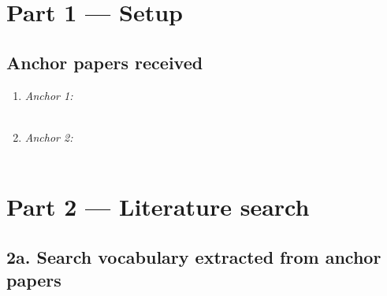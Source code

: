 

\section*{Part 1 — Setup}

\subsection*{Anchor papers received}


\begin{enumerate}
  \item \textit{Anchor 1:} \\[4pt]
        \underline{\hspace{13cm}} \\[4pt]
        \underline{\hspace{13cm}}
  \vspace{0.3cm}
  \item \textit{Anchor 2:} \\[4pt]
        \underline{\hspace{13cm}} \\[4pt]
        \underline{\hspace{13cm}}
\end{enumerate}


\section*{Part 2 — Literature search}

\subsection*{2a. Search vocabulary extracted from anchor papers}


